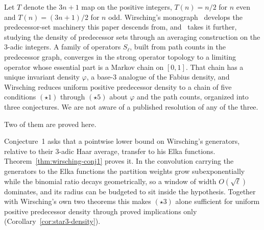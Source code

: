 \documentclass[11pt]{article}
\theoremstyle{definition}
\theoremstyle{remark}
\begin{document}
Let $T$ denote the $3n+1$ map on the positive integers, $T(n)=n/2$ for
$n$ even and $T(n)=(3n+1)/2$ for $n$ odd. Wirsching's
monograph~\cite{Wirsching1998Book} develops the predecessor-set
machinery this paper descends from, and~\cite{Wirsching2003} takes it
further, studying the density of predecessor sets through an averaging
construction on the $3$-adic integers. A family of operators
$S_\ell$, built from path counts in the predecessor graph, converges in
the strong operator topology to a limiting operator whose essential
part is a Markov chain on $[0,1]$. That chain has a unique invariant
density $\varphi$, a base-$3$ analogue of the Fabius density, and
Wirsching reduces uniform positive predecessor density to a chain of
five conditions $(\star1)$ through $(\star5)$ about $\varphi$ and the
path counts, organized into three conjectures. We are not aware of a
published resolution of any of the three.

Two of them are proved here.

Conjecture~1 asks that a pointwise lower bound on Wirsching's
generators, relative to their $3$-adic Haar average, transfer to his
Elka functions. Theorem~\ref{thm:wirsching-conj1} proves it. In the
convolution carrying the generators to the Elka functions the partition
weights grow subexponentially while the binomial ratio decays
geometrically, so a window of width $O(\sqrt\ell)$ dominates, and its
radius can be budgeted to sit inside the hypothesis. Together with
Wirsching's own two theorems this makes $(\star3)$ alone sufficient for
uniform positive predecessor density through proved implications only
(Corollary~\ref{cor:star3-density}).
\end{document}
